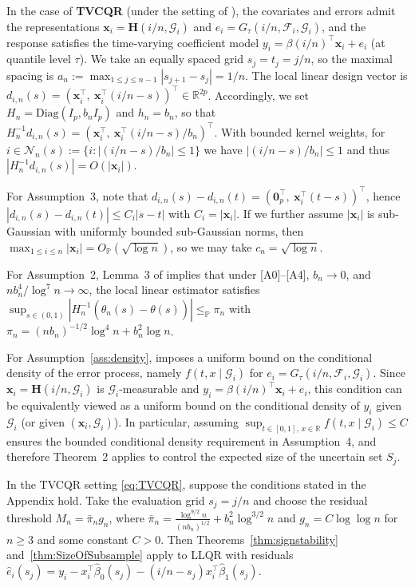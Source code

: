 \documentclass[lineno]{biometrika}
\begin{document}
In the case of \textbf{TVCQR} (under the setting of \cite{wu2017nonparametric}), the covariates and errors admit the representations $\mathbf{x}_i=\mathbf{H}(i/n,\mathcal G_i)$ and $e_i=G_\tau(i/n,\mathcal F_i,\mathcal G_i)$, and the response satisfies the time-varying coefficient model $y_i=\beta(i/n)^\top\mathbf{x}_i+e_i$ (at quantile level $\tau$). We take an equally spaced grid $s_j=t_j=j/n$, so the maximal spacing is $a_n:=\max_{1\le j\le n-1}|s_{j+1}-s_j|=1/n$. The local linear design vector is $d_{i,n}(s)=(\mathbf{x}_i^\top,\ \mathbf{x}_i^\top(i/n-s))^\top\in\mathbb{R}^{2p}$. Accordingly, we set $H_n=\mathrm{Diag}(I_p,b_n I_p)$ and $h_n=b_n$, so that $H_n^{-1}d_{i,n}(s)=(\mathbf{x}_i^\top,\ \mathbf{x}_i^\top(i/n-s)/b_n)^\top$. With bounded kernel weights, for $i\in\mathcal N_n(s):=\{i:|(i/n-s)/b_n|\le 1\}$ we have $|(i/n-s)/b_n|\le 1$ and thus $|H_n^{-1}d_{i,n}(s)|=O(|\mathbf{x}_i|)$.

For Assumption~3, note that $d_{i,n}(s)-d_{i,n}(t)=(\mathbf{0}_p^\top,\ \mathbf{x}_i^\top(t-s))^\top$, hence $|d_{i,n}(s)-d_{i,n}(t)|\le C_i|s-t|$ with $C_i=|\mathbf{x}_i|$. If we further assume $|\mathbf{x}_i|$ is sub-Gaussian with uniformly bounded sub-Gaussian norms, then $\max_{1\le i\le n}|\mathbf{x}_i|=O_{\mathbb P}(\sqrt{\log n})$, so we may take $c_n=\sqrt{\log n}$.

For Assumption~2, Lemma~3 of \cite{wu2017nonparametric} implies that under [A0]--[A4], $b_n\to0$, and $nb_n^4/\log^7 n\to\infty$, the local linear estimator satisfies $\sup_{s\in(0,1)}|H_n^{-1}(\hat\theta_n(s)-\theta(s))|\le_{\mathbb P}\pi_n$ with $\pi_n=(nb_n)^{-1/2}\log^4 n+b_n^2\log n$.

For Assumption~\ref{ass:density}, \cite{wu2017nonparametric} imposes a uniform bound on the conditional density of the error process, namely $f(t,x\mid\mathcal G_i)$ for $e_i=G_\tau(i/n,\mathcal F_i,\mathcal G_i)$. Since $\mathbf{x}_i=\mathbf{H}(i/n,\mathcal G_i)$ is $\mathcal G_i$-measurable and $y_i=\beta(i/n)^\top\mathbf{x}_i+e_i$, this condition can be equivalently viewed as a uniform bound on the conditional density of $y_i$ given $\mathcal G_i$ (or given $(\mathbf{x}_i,\mathcal G_i)$). In particular, assuming $\sup_{t\in[0,1],\,x\in\mathbb R} f(t,x\mid\mathcal G_i)\le C$ ensures the bounded conditional density requirement in Assumption~4, and therefore Theorem~2 applies to control the expected size of the uncertain set $S_j$.

\begin{corollary}
\label{cor:llqr}
In the TVCQR setting \eqref{eq:TVCQR}, suppose the conditions stated in the Appendix hold. 
Take the evaluation grid $s_j=j/n$ and choose the residual threshold $M_n=\bar\pi_n g_n$, where 
$\bar\pi_n=\frac{\log^{9/2} n}{(nb_n)^{1/2}}+b_n^2\log^{3/2} n$ and $g_n=C\log\log n$ for $n\ge 3$ and some constant $C>0$. 
Then Theorems~\ref{thm:signstability} and~\ref{thm:SizeOfSubsample} apply to LLQR with residuals
$\hat e_i(s_j)=y_i-x_i^\top\hat\beta_0(s_j)-(i/n-s_j)x_i^\top\hat\beta_1(s_j)$.
\end{corollary}
\end{document}
